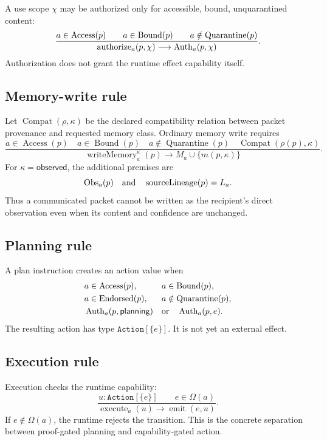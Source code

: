A use scope \(\chi\) may be authorized only for accessible, bound,
unquarantined content:
\[
\frac{
  a\in\operatorname{Access}(p)
  \qquad
  a\in\operatorname{Bound}(p)
  \qquad
  a\notin\operatorname{Quarantine}(p)
}{
  \operatorname{authorize}_a(p,\chi)
  \longrightarrow
  \operatorname{Auth}_a(p,\chi)
}.
\]
Authorization does not grant the runtime effect capability itself.

\subsection{Memory-write rule}

Let \(\operatorname{Compat}(\rho,\kappa)\) be the declared compatibility
relation between packet provenance and requested memory class.  Ordinary memory
write requires
\[
\frac{
  a\in\operatorname{Access}(p)
  \quad
  a\in\operatorname{Bound}(p)
  \quad
  a\notin\operatorname{Quarantine}(p)
  \quad
  \operatorname{Compat}(\rho(p),\kappa)
}{
  \operatorname{writeMemory}_a^\kappa(p)
  \longrightarrow
  M_a\cup\{m(p,\kappa)\}
}.
\]
For \(\kappa=\mathsf{observed}\), the additional premises are
\[
\operatorname{Obs}_a(p)
\quad\text{and}\quad
\operatorname{sourceLineage}(p)=L_a.
\]
Thus a communicated packet cannot be written as the recipient's direct
observation even when its content and confidence are unchanged.

\subsection{Planning rule}

A plan instruction creates an action value when
\[
\begin{aligned}
&a\in\operatorname{Access}(p),
&&a\in\operatorname{Bound}(p),\\
&a\in\operatorname{Endorsed}(p),
&&a\notin\operatorname{Quarantine}(p),\\
&\operatorname{Auth}_a(p,\mathsf{planning})
&&\text{or}\quad\operatorname{Auth}_a(p,e).
\end{aligned}
\]
The resulting action has type \(\texttt{Action}[\{e\}]\).  It is not yet an
external effect.

\subsection{Execution rule}

Execution checks the runtime capability:
\[
\frac{
  u:\texttt{Action}[\{e\}]
  \qquad
  e\in\Omega(a)
}{
  \operatorname{execute}_a(u)
  \longrightarrow
  \operatorname{emit}(e,u)
}.
\]
If \(e\notin\Omega(a)\), the runtime rejects the transition.  This is the
concrete separation between proof-gated planning and capability-gated action.

